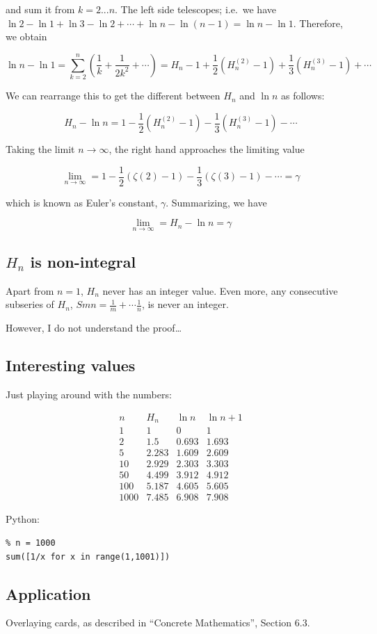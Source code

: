 and sum it from \(k=2...n\). The left side telescopes; i.e.~we have \(\ln 2 - \ln 1 + \ln3 - \ln 2 + \cdots + \ln n - \ln (n-1) = \ln n - \ln 1\). Therefore, we obtain

\[
\ln n - \ln 1 = \sum_{k=2}^n \left( \frac{1}{k} + \frac{1}{2k^2} + \cdots \right) = H_n-1 + \frac{1}{2} (H_n^{(2)}-1) + \frac{1}{3} (H_n^{(3)}-1) + \cdots
\]

We can rearrange this to get the different between \(H_n\) and \(\ln n\) as follows:

\[
H_n - \ln n = 1 - \frac{1}{2} (H_n^{(2)}-1) - \frac{1}{3} (H_n^{(3)}-1) - \cdots
\]

Taking the limit \(n \rightarrow \infty\), the right hand approaches the limiting value

\[
\lim_{n \rightarrow \infty} = 1 - \frac{1}{2} (\zeta(2)-1) - \frac{1}{3} (\zeta(3)-1) - \cdots = \gamma
\]

which is known as Euler's constant, \(\gamma\). Summarizing, we have

\[
\lim_{n \rightarrow \infty} = H_n - \ln n = \gamma
\]

\subsection{$H_n$ is non-integral}

Apart from \(n=1\), \(H_n\) never has an integer value. Even more, any consecutive subseries of \(H_n\), \(Smn = \frac{1}{m} + \cdots \frac{1}{n}\), is never an integer.

However, I do not understand the proof\ldots{}

\subsection{Interesting values}

Just playing around with the numbers:

\[
\begin{array}{cccc}
n & H_n & \ln n & \ln n+1 \\
\hline
1    & 1     & 0     & 1 \\
2    & 1.5   & 0.693 & 1.693 \\
5    & 2.283 & 1.609 & 2.609 \\
10   & 2.929 & 2.303 & 3.303 \\
50   & 4.499 & 3.912 & 4.912 \\
100  & 5.187 & 4.605 & 5.605 \\
1000 & 7.485 & 6.908 & 7.908
\end{array}
\]

Python:

\begin{verbatim}
% n = 1000
sum([1/x for x in range(1,1001)])
\end{verbatim}

\subsection{Application}\label{application}

Overlaying cards, as described in ``Concrete Mathematics'', Section 6.3.
